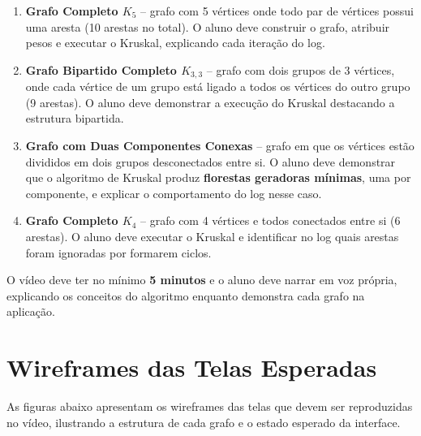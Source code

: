 \documentclass[12pt,a4paper]{article}
\begin{document}
\begin{enumerate}
    \item \textbf{Grafo Completo $K_5$} -- grafo com 5 vértices onde todo par de vértices possui uma aresta (10 arestas no total). O aluno deve construir o grafo, atribuir pesos e executar o Kruskal, explicando cada iteração do log.
    \item \textbf{Grafo Bipartido Completo $K_{3,3}$} -- grafo com dois grupos de 3 vértices, onde cada vértice de um grupo está ligado a todos os vértices do outro grupo (9 arestas). O aluno deve demonstrar a execução do Kruskal destacando a estrutura bipartida.
    \item \textbf{Grafo com Duas Componentes Conexas} -- grafo em que os vértices estão divididos em dois grupos desconectados entre si. O aluno deve demonstrar que o algoritmo de Kruskal produz \textbf{florestas geradoras mínimas}, uma por componente, e explicar o comportamento do log nesse caso.
    \item \textbf{Grafo Completo $K_4$} -- grafo com 4 vértices e todos conectados entre si (6 arestas). O aluno deve executar o Kruskal e identificar no log quais arestas foram ignoradas por formarem ciclos.
\end{enumerate}

O vídeo deve ter no mínimo \textbf{5 minutos} e o aluno deve narrar em voz própria, explicando os conceitos do algoritmo enquanto demonstra cada grafo na aplicação.

\section*{Wireframes das Telas Esperadas}

As figuras abaixo apresentam os wireframes das telas que devem ser reproduzidas no vídeo, ilustrando a estrutura de cada grafo e o estado esperado da interface.
\end{document}
